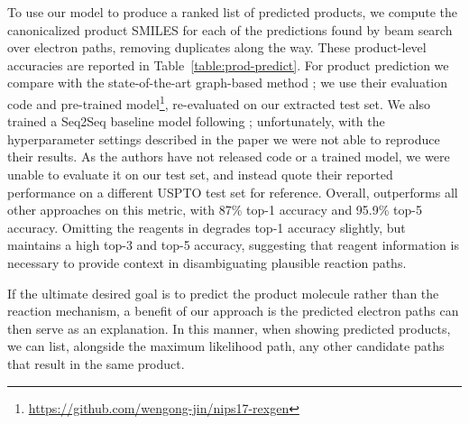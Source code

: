 To use our model to produce a ranked list of predicted products, we compute the canonicalized product SMILES for each of the predictions found by beam search over electron paths, removing duplicates along the way. 
These product-level accuracies are reported in Table~\ref{table:prod-predict}.
For product prediction we compare with the state-of-the-art graph-based method \cite{jin2017predicting};
we use their evaluation code and pre-trained model\footnote{\url{https://github.com/wengong-jin/nips17-rexgen}},
re-evaluated on our extracted test set. 
We also trained a Seq2Seq baseline model following \cite{schwaller2017found};
unfortunately, with the hyperparameter settings described in the paper we were not able to reproduce their results.
As the authors have not released code or a trained model, we were unable to evaluate it on our test set, and instead quote their reported performance on a different USPTO test set for reference.
Overall, \ourModelR outperforms all other approaches on this metric, with 87\% top-1 accuracy and 95.9\% top-5 accuracy.
Omitting the reagents in \ourModelR degrades top-1 accuracy slightly, but maintains a high top-3 and top-5 accuracy,
suggesting that reagent information is necessary to provide context in disambiguating plausible reaction paths.



If the ultimate desired goal is to predict the product molecule rather than the reaction mechanism,
a benefit of our approach is the predicted electron paths can then serve as an explanation. 
In this manner, when showing predicted products, we can list, alongside the maximum likelihood path, any other candidate paths that result in the same product. 




